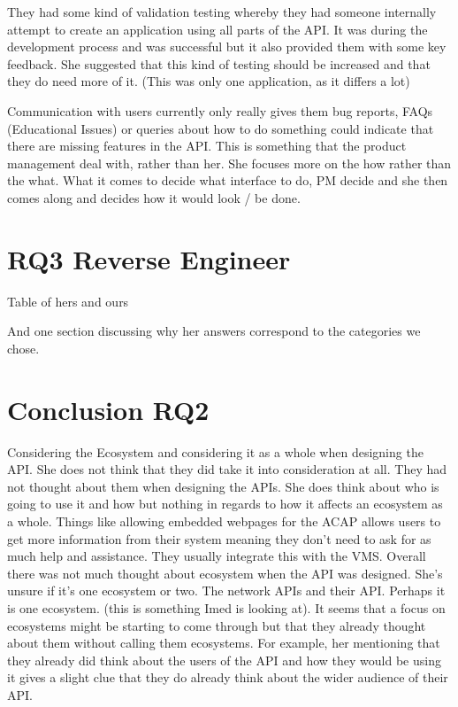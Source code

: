 \documentclass[conference]{IEEEtran}
\begin{document}
They had some kind of validation testing whereby they had someone internally attempt to create an application using all parts of the API. It was during the development process and was successful but it also provided them with some key feedback. She suggested that this kind of testing should be increased and that they do need more of it. (This was only one application, as it differs a lot)

Communication with users currently only really gives them bug reports, FAQs (Educational Issues) or queries about how to do something could indicate that there are missing features in the API. This is something that the product management deal with, rather than her. She focuses more on the how rather than the what. What it comes to decide what interface to do, PM decide and she then comes along and decides how it would look / be done. 

\section{RQ3 Reverse Engineer}
Table of hers and ours

And one section discussing why her answers correspond to the categories we chose.





\section{Conclusion RQ2} \label{conclusion}







Considering the Ecosystem and considering it as a whole when designing the API. She does not think that they did take it into consideration at all. They had not thought about them when designing the APIs. She does think about who is going to use it and how but nothing in regards to how it affects an ecosystem as a whole. Things like allowing embedded webpages for the ACAP allows users to get more information from their system meaning they don’t need to ask for as much help and assistance. They usually integrate this with the VMS. Overall there was not much thought about ecosystem when the API was designed. She’s unsure if it’s one ecosystem or two. The network APIs and their API. Perhaps it is one ecosystem. (this is something Imed is looking at).
It seems that a focus on ecosystems might be starting to come through but that they already thought about them without calling them ecosystems. For example, her mentioning that they already did think about the users of the API and how they would be using it gives a slight clue that they do already think about the wider audience of their API.
\end{document}
